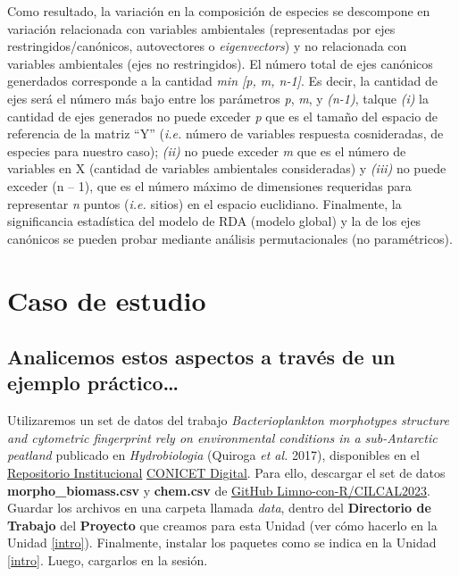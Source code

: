 \documentclass[
]{book}
\begin{document}
Como resultado, la variación en la composición de especies se descompone en variación relacionada con variables ambientales (representadas por ejes restringidos/canónicos, autovectores o \emph{eigenvectors}) y no relacionada con variables ambientales (ejes no restringidos). El número total de ejes canónicos generdados corresponde a la cantidad \emph{min {[}p, m, n-1{]}}. Es decir, la cantidad de ejes será el número más bajo entre los parámetros \emph{p}, \emph{m}, y \emph{(n-1)}, talque \emph{(i)} la cantidad de ejes generados no puede exceder \emph{p} que es el tamaño del espacio de referencia de la matriz ``Y'' (\emph{i.e.} número de variables respuesta cosnideradas, de especies para nuestro caso); \emph{(ii)} no puede exceder \emph{m} que es el número de variables en X (cantidad de variables ambientales consideradas) y \emph{(iii)} no puede exceder (n -- 1), que es el número máximo de dimensiones requeridas para representar \emph{n} puntos (\emph{i.e.} sitios) en el espacio euclidiano. Finalmente, la significancia estadística del modelo de RDA (modelo global) y la de los ejes canónicos se pueden probar mediante análisis permutacionales (no paramétricos).

\hypertarget{caso-de-estudio-1}{%
\section{Caso de estudio}\label{caso-de-estudio-1}}

\hypertarget{analicemos-estos-aspectos-a-travuxe9s-de-un-ejemplo-pruxe1ctico}{%
\subsection{Analicemos estos aspectos a través de un ejemplo práctico\ldots{}}\label{analicemos-estos-aspectos-a-travuxe9s-de-un-ejemplo-pruxe1ctico}}

Utilizaremos un set de datos del trabajo \emph{Bacterioplankton morphotypes structure and cytometric fingerprint rely on environmental conditions in a sub-Antarctic peatland} publicado en \emph{Hydrobiologia} (Quiroga \emph{et al.} 2017), disponibles en el \href{http://hdl.handle.net/11336/201811}{Repositorio Institucional} \href{http://hdl.handle.net/11336/201874}{CONICET Digital}. Para ello, descargar el set de datos \textbf{morpho\_biomass.csv} y \textbf{chem.csv} de \href{https://github.com/Limno-con-R/CILCAL2023/tree/main/datasets}{GitHub Limno-con-R/CILCAL2023}.
Guardar los archivos en una carpeta llamada \emph{data}, dentro del \textbf{Directorio de Trabajo} del \textbf{Proyecto} que creamos para esta Unidad (ver cómo hacerlo en la Unidad \ref{intro}). Finalmente, instalar los paquetes como se indica en la Unidad \ref{intro}. Luego, cargarlos en la sesión.
\end{document}
